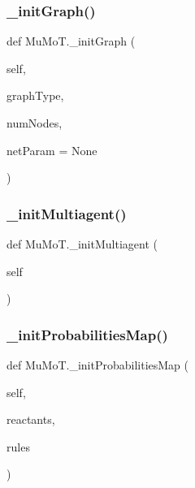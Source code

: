 \mbox{\label{namespace_mu_mo_t_aa2e74612dbe60bbf3405d1b814aa1596}} 
\subsubsection{\texorpdfstring{\+\_\+init\+Graph()}{\_initGraph()}}
{\footnotesize\ttfamily def Mu\+Mo\+T.\+\_\+init\+Graph (\begin{DoxyParamCaption}\item[{}]{self,  }\item[{}]{graph\+Type,  }\item[{}]{num\+Nodes,  }\item[{}]{net\+Param = {\ttfamily None} }\end{DoxyParamCaption})\hspace{0.3cm}{\ttfamily [private]}}

\mbox{\label{namespace_mu_mo_t_a5b0e59223eace5f42e29d56989db7f6c}} 
\subsubsection{\texorpdfstring{\+\_\+init\+Multiagent()}{\_initMultiagent()}}
{\footnotesize\ttfamily def Mu\+Mo\+T.\+\_\+init\+Multiagent (\begin{DoxyParamCaption}\item[{}]{self }\end{DoxyParamCaption})\hspace{0.3cm}{\ttfamily [private]}}

\mbox{\label{namespace_mu_mo_t_a3c7604d067731ffa76cf57c49b5e855e}} 
\subsubsection{\texorpdfstring{\+\_\+init\+Probabilities\+Map()}{\_initProbabilitiesMap()}}
{\footnotesize\ttfamily def Mu\+Mo\+T.\+\_\+init\+Probabilities\+Map (\begin{DoxyParamCaption}\item[{}]{self,  }\item[{}]{reactants,  }\item[{}]{rules }\end{DoxyParamCaption})\hspace{0.3cm}{\ttfamily [private]}}

